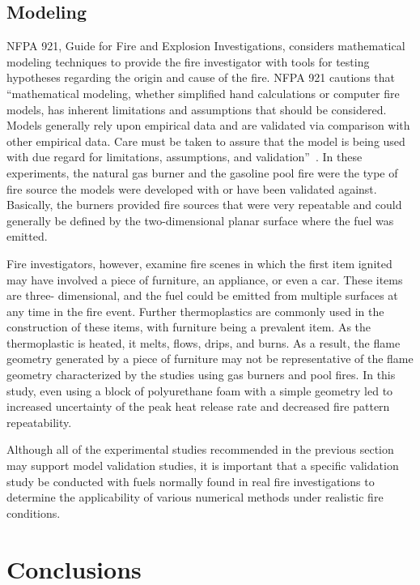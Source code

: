 \documentclass[twoside]{uocthesis}
\begin{document}
{\section{Modeling}
          
NFPA 921, Guide for Fire and Explosion Investigations, considers mathematical modeling techniques to provide the fire investigator with tools for testing hypotheses regarding the origin and cause of the fire.  NFPA 921 cautions that ``mathematical modeling, whether simplified hand calculations or computer fire models, has inherent limitations and assumptions that should be considered. Models generally rely upon empirical data and are validated via comparison with other empirical data. Care must be taken to assure that the model is being used with due regard for limitations, assumptions, and validation''~\cite{NFPA:921}.  In these experiments, the natural gas burner and the gasoline pool fire were the type of fire source the models were developed with or have been validated against.  Basically, the burners provided fire sources that were very repeatable and could generally be defined by the two-dimensional planar surface where the fuel was emitted.  

Fire investigators, however, examine fire scenes in which the first item ignited may have involved a piece of furniture, an appliance, or even a car.   These items are three- dimensional, and the fuel could be emitted from multiple surfaces at any time in the fire event.  Further thermoplastics are commonly used in the construction of these items, with furniture being a prevalent item.  As the thermoplastic is heated, it melts, flows, drips, and burns.   As a result, the flame geometry generated by a piece of furniture may not be representative of the flame geometry characterized by the studies using gas burners and pool fires.  In this study, even using a block of polyurethane foam with a simple geometry led to increased uncertainty of the peak heat release rate and decreased fire pattern repeatability.  

Although all of the experimental studies recommended in the previous section may support model validation studies, it is important that a specific validation study be conducted with fuels normally found in real fire investigations to determine the applicability of various numerical methods under realistic fire conditions. 

\chapter{Conclusions}

}
\end{document}
